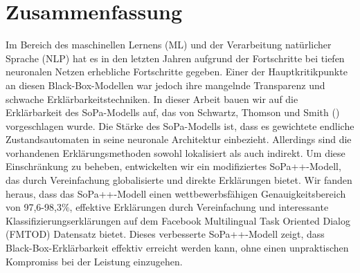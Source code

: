 \chapter{Zusammenfassung}

Im Bereich des maschinellen Lernens (ML) und der Verarbeitung natürlicher
Sprache (NLP) hat es in den letzten Jahren aufgrund der Fortschritte bei tiefen
neuronalen Netzen erhebliche Fortschritte gegeben. Einer der Hauptkritikpunkte
an diesen Black-Box-Modellen war jedoch ihre mangelnde Transparenz und
schwache Erklärbarkeitstechniken. In dieser Arbeit bauen wir auf die
Erklärbarkeit des SoPa-Modells auf, das von Schwartz, Thomson und Smith
(\citeyear{schwartz2018sopa}) vorgeschlagen wurde. Die Stärke des SoPa-Modells
ist, dass es gewichtete endliche Zustandsautomaten in seine neuronale
Architektur einbezieht. Allerdings sind die vorhandenen Erklärungsmethoden
sowohl lokalisiert als auch indirekt. Um diese Einschränkung zu beheben,
entwickelten wir ein modifiziertes SoPa++-Modell, das durch Vereinfachung
globalisierte und direkte Erklärungen bietet. Wir fanden heraus, dass das
SoPa++-Modell einen wettbewerbsfähigen Genauigkeitsbereich von 97,6-98,3$\%$,
effektive Erklärungen durch Vereinfachung und interessante
Klassifizierungserklärungen auf dem Facebook Multilingual Task Oriented Dialog
(FMTOD) Datensatz bietet. Dieses verbesserte SoPa++-Modell zeigt, dass
Black-Box-Erklärbarkeit effektiv erreicht werden kann, ohne einen unpraktischen
Kompromiss bei der Leistung einzugehen.

